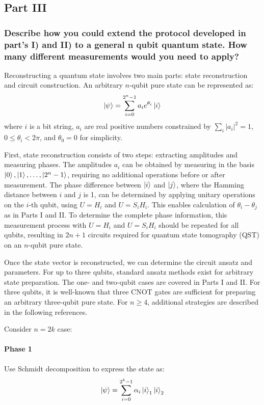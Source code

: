 \documentclass[a4paper, 11pt]{article}
\begin{document}
\subsection*{Part III}
\subsubsection*{Describe how you could extend the protocol developed in part's I) and II) to a general n qubit quantum state. How many different measurements would you need to apply?}

Reconstructing a quantum state involves two main parts: state reconstruction and circuit construction. An arbitrary $n$-qubit pure state can be represented as:
\begin{equation}
  \ket{\psi} = \sum_{i=0}^{2^n -1} a_{i}e^{\theta_{i}} \ket{i}
\end{equation}
where $i$ is a bit string, $a_{i}$ are real positive numbers constrained by $\sum_{i} |a_{i}|^{2} = 1$, $0 \le \theta_{i} < 2\pi$, and $\theta_{0} = 0$ for simplicity.

First, state reconstruction consists of two steps: extracting amplitudes and measuring phases. 
The amplitudes $a_{i}$ can be obtained by measuring in the basis ${ \ket{0}, \ket{1}, \dots, \ket{2^n -1} }$, requiring no additional operations before or after measurement. 
The phase difference between $\ket{i}$ and $\ket{j}$, where the Hamming distance between $i$ and $j$ is 1, can be determined by applying unitary operations on the $i$-th qubit, using $U=H_{i}$ and $U=S_{i} H_{i}$. 
This enables calculation of $\theta_{i} - \theta_{j}$ as in Parts I and II. 
To determine the complete phase information, this measurement process with $U=H_{i}$ and $U=S_{i} H_{i}$ should be repeated for all qubits, resulting in $2n+1$ circuits required for quantum state tomography (QST) on an $n$-qubit pure state.

Once the state vector is reconstructed, we can determine the circuit ansatz and parameters. 
For up to three qubits, standard ansatz methods exist for arbitrary state preparation. 
The one- and two-qubit cases are covered in Parts I and II. 
For three qubits, it is well-known that three CNOT gates are sufficient for preparing an arbitrary three-qubit pure state\cite{perdomo2022preparation3qubitstates}.
For $n \geq 4$, additional strategies are described in the following references\cite{PhysRevA.93.032318, PhysRevA.83.032302}. 


Consider $n=2k$ case:
\paragraph{Phase 1}
Use Schmidt decomposition to express the state as:
\begin{equation}
  \ket{\psi} = \sum_{i=0}^{2^k -1} \alpha_{i} \ket{i}_1\ket{i}_2
\end{equation}
\end{document}
